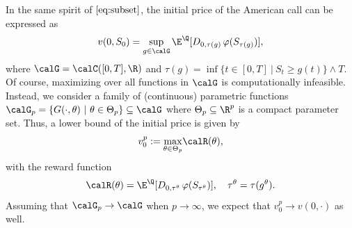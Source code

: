  In the same spirit of $\eqref{eq:subset}$, the initial price of the American call can be expressed as 
 \begin{equation*}
     v(0,S_0) = \underset{g\in \calG}{\text{sup}} \, \E^{\Q}[D_{0,\tau(g)}\, \varphi(S_{\tau(g)})],
 \end{equation*}
 where  $\calG = \calC([0,T], \R)$ and 
 $\tau(g) = \inf\{t\in [0,T] \ | \ S_t \ge g(t) \} \wedge T$. 
 Of course, maximizing over all functions in $\calG$ is computationally infeasible. Instead, we consider a family of (continuous) parametric functions $\calG_{p} = \{ G(\cdot, \theta) \ | \ \theta \in \Theta_p\} \subseteq \calG$ where $\Theta_p \subseteq \R^p$ is a compact parameter set. 
 Thus,   a lower bound of the initial price is given by
 \begin{equation}\label{eq:paramValue}
     v_0^p := \underset{\theta \in \Theta_p}{\text{max}} \calR(\theta)  ,
 \end{equation} 
 with the reward function
  \begin{equation}\label{eq:reward}
     \calR(\theta) =  \E^{\Q}[D_{0,\tau^{\theta}}\, \varphi(S_{\tau^{\theta}})], \quad   \tau^{\theta} = \tau(g^{\theta}).
 \end{equation} 
 Assuming that $\calG_p \to \calG$ when $p \to \infty$, we expect that $v_0^p \to v(0,\cdot)$ as well. %
   
